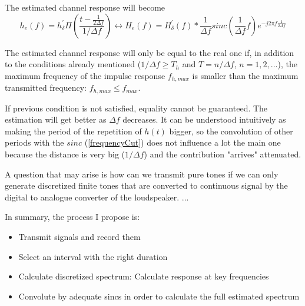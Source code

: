 The estimated channel response will become
\begin{equation}
h_e(f) = h_\delta^{'} \Pi\left( \frac{t - \frac{1}{2\Delta f}}{1/\Delta f} \right) \leftrightarrow
H_e(f) = H_\delta^{'}(f) \ast \frac{1}{\Delta f} \mathit{sinc}\left( \frac{1}{\Delta f} f \right) e^{-j 2 \pi f \frac{1}{2 \Delta f}}
\end{equation}

The estimated channel response will only be equal to the real one if, in addition to the conditions already mentioned ($1/\Delta f \geq T_h$ and $T = n/\Delta f$, $n = 1, 2, ...$), the maximum frequency of the impulse response $f_{h,max}$ is smaller than the maximum transmitted frequency: $f_{h,max} \leq f_{max}$.

If previous condition is not satisfied, equality cannot be guaranteed. The estimation will get better as $\Delta f$ decreases. It can be understood intuitively as making the period of the repetition of $h(t)$ bigger, so the convolution of other periods with the $\mathit{sinc}$ (\autoref{frequencyCut}) does not influence a lot the main one because the distance is very big ($1/\Delta f$) and the contribution "arrives" attenuated.

A question that may arise is how can we transmit pure tones if we can only generate discretized finite tones that are converted to continuous signal by the digital to analogue converter of the loudspeaker.
...

In summary, the process I propose is:
\begin{itemize}
	\item Transmit signals and record them
	\item Select an interval with the right duration
	\item Calculate discretized spectrum: Calculate response at key frequencies
	\item Convolute by adequate sincs in order to calculate the full estimated spectrum
\end{itemize}

